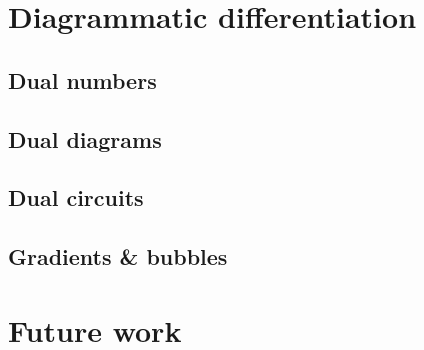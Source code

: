 \section{Diagrammatic differentiation} \label{chapter-3:diag-diff}

\subsection{Dual numbers}
\subsection{Dual diagrams}
\subsection{Dual circuits}
\subsection{Gradients \& bubbles}

\section{Future work}


\setlength{\baselineskip}{0pt} %

{\renewcommand*\MakeUppercase[1]{#1}%
\printbibliography[heading=bibintoc,title=References]}


